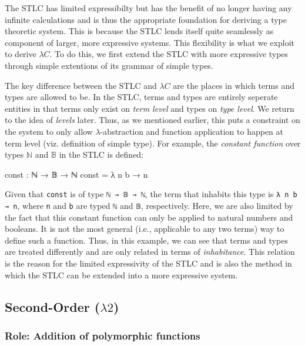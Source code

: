 \documentclass[12pt]{article}
\begin{document}
The STLC has limited expressibilty but has the benefit of no longer having any
infinite calculations \cite{} and is thus the appropriate foundation for
deriving a type theoretic system. This is because the STLC lends itself quite
seamlessly as component of larger, more expressive systems. This flexibility is
what we exploit to derive \(\lambda C\). To do this, we first extend the STLC
with more expressive types through simple extentions of its grammar of simple
types.

The key difference between the STLC and \(\lambda C\) are the places in which
terms and types are allowed to be. In the STLC, terms and types are entirely
seperate entities in that terms only exist on {\em term level} and types
on {\em type level}. We return to the idea of {\em levels} later. Thus, as we
mentioned earlier, this puts a constraint on the system to only allow
\(\lambda\)-abstraction and function application to happen at term level
(viz. definition of simple type). For example, the \textit{constant function}
over types \(\mathbb{N}\) and \(\mathbb{B}\) in the STLC is defined:
\begin{center}
\begin{minipage}{0.5\textwidth}
\begin{code}
const : ℕ → 𝔹 → ℕ
const = λ n b → n
\end{code}
\end{minipage}
\end{center}
Given that {\tt const} is of type {\tt ℕ → 𝔹 → ℕ}, the term that inhabits this
type is {\tt λ n b → n}, where {\tt n} and {\tt b} are typed {\tt ℕ} and {\tt 𝔹},
respectively. Here, we are also limited by the fact that this constant function can
only be applied to natural numbers and booleans. It is not the most general
(i.e., applicable to any two terms) way to define such a function. Thus, in this
example, we can see that terms and types are treated differently and are only
related in terms of {\em inhabitance}. This relation is the reason for the
limited expressivity of the STLC and is also the method in which the STLC can be
extended into a more expressive system.

\subsection*{Second-Order (\(\lambda2\))}
\subsubsection*{Role: Addition of polymorphic functions}
\end{document}
